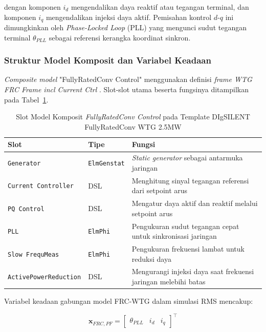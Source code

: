 dengan komponen $i_d$ mengendalikan daya reaktif atau tegangan terminal, dan komponen
$i_q$ mengendalikan injeksi daya aktif. Pemisahan kontrol $d$-$q$ ini dimungkinkan oleh
\textit{Phase-Locked Loop} (PLL) yang mengunci sudut tegangan terminal $\theta_{PLL}$
sebagai referensi kerangka koordinat sinkron.

\subsubsection{Struktur Model Komposit dan Variabel Keadaan}

\textit{Composite model} "FullyRatedConv Control" menggunakan definisi \textit{frame
WTG FRC Frame incl Current Ctrl} \cite{digsilent2024frc}. Slot-slot utama beserta
fungsinya ditampilkan pada Tabel~\ref{tab:frc-template-slots}.

\begin{table}[H]
\centering
\caption[Slot Model Komposit \textit{FullyRatedConv Control} pada Template DIgSILENT FullyRatedConv WTG 2.5MW]{Slot Model Komposit \textit{FullyRatedConv Control} pada Template DIgSILENT
FullyRatedConv WTG 2.5MW \cite{digsilent2024frc}}
\label{tab:frc-template-slots}
\small
\setlength{\tabcolsep}{5pt}
\begin{tabular}{p{3.8cm} p{2.3cm} p{7.1cm}}
\toprule
\textbf{Slot} & \textbf{Tipe} & \textbf{Fungsi} \\
\midrule
\texttt{Generator} & \texttt{ElmGenstat} & \textit{Static generator} sebagai antarmuka jaringan \\
\texttt{Current Controller} & DSL & Menghitung sinyal tegangan referensi dari setpoint arus \\
\texttt{PQ Control} & DSL & Mengatur daya aktif dan reaktif melalui setpoint arus \\
\texttt{PLL} & \texttt{ElmPhi} & Pengukuran sudut tegangan cepat untuk sinkronisasi jaringan \\
\texttt{Slow FrequMeas} & \texttt{ElmPhi} & Pengukuran frekuensi lambat untuk reduksi daya \\
\texttt{ActivePowerReduction} & DSL & Mengurangi injeksi daya saat frekuensi jaringan melebihi batas \\
\bottomrule
\end{tabular}
\end{table}

Variabel keadaan gabungan model FRC-WTG dalam simulasi RMS mencakup:

\begin{equation}
  \mathbf{x}_{FRC,PF} =
  \begin{bmatrix}\theta_{PLL} & i_d & i_q\end{bmatrix}^\top
  \label{eq:frc-pf-statevec}
\end{equation}

